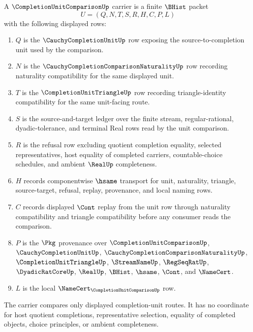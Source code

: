 \begin{definition}
\label{def:completion-unit-comparison-carrier}
A $\CompletionUnitComparisonUp$ carrier is a finite $\BHist$ packet
$$
U=(Q,N,T,S,R,H,C,P,L)
$$
with the following displayed rows:
\begin{enumerate}
\item $Q$ is the $\CauchyCompletionUnitUp$ row exposing the source-to-completion unit used by the comparison.
\item $N$ is the $\CauchyCompletionComparisonNaturalityUp$ row recording naturality compatibility for the same displayed unit.
\item $T$ is the $\CompletionUnitTriangleUp$ row recording triangle-identity compatibility for the same unit-facing route.
\item $S$ is the source-and-target ledger over the finite stream, regular-rational, dyadic-tolerance, and terminal Real rows read by the unit comparison.
\item $R$ is the refusal row excluding quotient completion equality, selected representatives, host equality of completed carriers, countable-choice schedules, and ambient $\RealUp$ completeness.
\item $H$ records componentwise $\hsame$ transport for unit, naturality, triangle, source-target, refusal, replay, provenance, and local naming rows.
\item $C$ records displayed $\Cont$ replay from the unit row through naturality compatibility and triangle compatibility before any consumer reads the comparison.
\item $P$ is the $\Pkg$ provenance over $\CompletionUnitComparisonUp$, $\CauchyCompletionUnitUp$, $\CauchyCompletionComparisonNaturalityUp$, $\CompletionUnitTriangleUp$, $\StreamNameUp$, $\RegSeqRatUp$, $\DyadicRatCoreUp$, $\RealUp$, $\BHist$, $\hsame$, $\Cont$, and $\NameCert$.
\item $L$ is the local $\NameCert_{\CompletionUnitComparisonUp}$ row.
\end{enumerate}
The carrier compares only displayed completion-unit routes. It has no coordinate for host quotient completions, representative selection, equality of completed objects, choice principles, or ambient completeness.
\end{definition}

